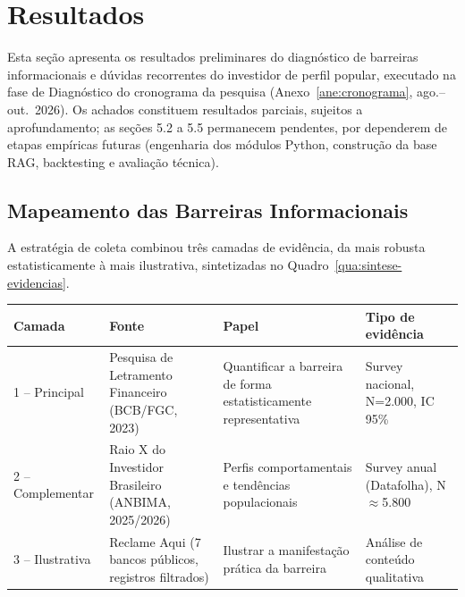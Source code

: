 \chapter{Resultados}
\label{cap:resultados}

Esta se\c{c}\~ao apresenta os resultados preliminares do diagn\'ostico de
barreiras informacionais e d\'uvidas recorrentes do investidor de perfil
popular, executado na fase de Diagn\'ostico do cronograma da pesquisa
(Anexo~\ref{ane:cronograma}, ago.--out.\ 2026). Os achados constituem
resultados parciais, sujeitos a aprofundamento; as se\c{c}\~oes 5.2 a 5.5
permanecem pendentes, por dependerem de etapas emp\'iricas futuras
(engenharia dos m\'odulos Python, constru\c{c}\~ao da base RAG,
backtesting e avalia\c{c}\~ao t\'ecnica).

\section{Mapeamento das Barreiras Informacionais}
\label{sec:mapeamento-barreiras}

A estrat\'egia de coleta combinou tr\^es camadas de evid\^encia, da mais
robusta estatisticamente \`a mais ilustrativa, sintetizadas no
Quadro~\ref{qua:sintese-evidencias}.

\begin{quadro}[htbp]
  \centering
  \caption{S\'intese das Evid\^encias sobre Barreiras Informacionais}
  \label{qua:sintese-evidencias}
  \small
  \begin{tabular}{p{2.2cm}p{3.6cm}p{3.6cm}p{4.2cm}}
    \toprule
    \textbf{Camada} & \textbf{Fonte} & \textbf{Papel} & \textbf{Tipo de evid\^encia} \\
    \midrule
    1 -- Principal & Pesquisa de Letramento Financeiro (BCB/FGC, 2023) & Quantificar a barreira de forma estatisticamente representativa & Survey nacional, N=2.000, IC 95\% \\
    2 -- Complementar & Raio X do Investidor Brasileiro (ANBIMA, 2025/2026) & Perfis comportamentais e tend\^encias populacionais & Survey anual (Datafolha), N$\approx$5.800 \\
    3 -- Ilustrativa & Reclame Aqui (7 bancos p\'ublicos, registros filtrados) & Ilustrar a manifesta\c{c}\~ao pr\'atica da barreira & An\'alise de conte\'udo qualitativa \autocite{bardin2011} \\
    \bottomrule
  \end{tabular}
\end{quadro}


